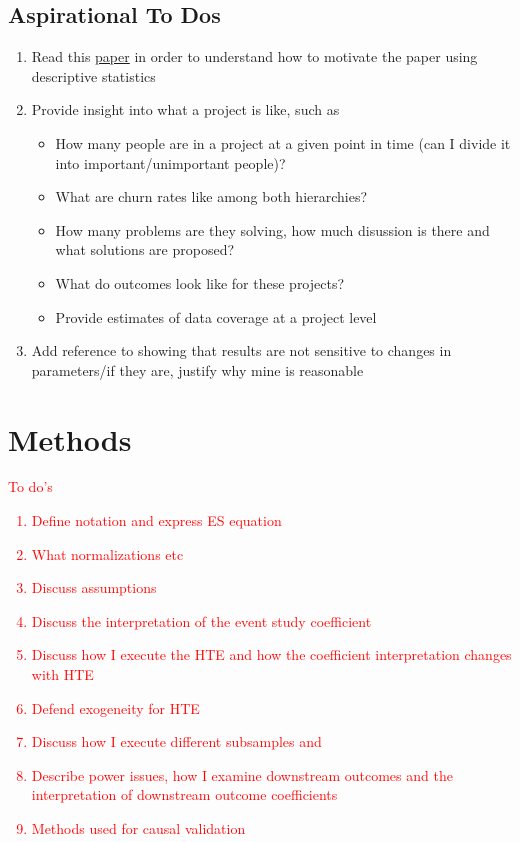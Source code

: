 \documentclass[12pt,notitlepage]{article}
\begin{document}
\subsection{Aspirational To Dos}
\begin{enumerate}
    \item Read this  \href{https://pubs.aeaweb.org/doi/pdfplus/10.1257/jep.36.3.211}{paper} in order to understand how to motivate the paper using descriptive statistics
    \item Provide insight into what a project is like, such as
    \begin{itemize}
        \item How many people are in a project at a given point in time (can I divide it into important/unimportant people)?
        \item What are churn rates like among both hierarchies?
        \item How many problems are they solving, how much disussion is there and what solutions are proposed?
        \item What do outcomes look like for these projects?
        \item Provide estimates of data coverage at a project level 
    \end{itemize}
    \item Add reference to showing that results are not sensitive to changes in parameters/if they are, justify why mine is reasonable 
\end{enumerate}



\section{Methods} \label{sec:method}



\textcolor{red}{To do's
\begin{enumerate}
    \item Define notation and express ES equation
    \item What normalizations etc
    \item Discuss assumptions
    \item Discuss the interpretation of the event study coefficient
    \item Discuss how I execute the HTE and how the coefficient interpretation changes with HTE
    \item Defend exogeneity for HTE
    \item Discuss how I execute different subsamples and 
    \item Describe power issues, how I examine downstream outcomes and the interpretation of downstream outcome coefficients
    \item Methods used for causal validation 
\end{enumerate}}
\end{document}
